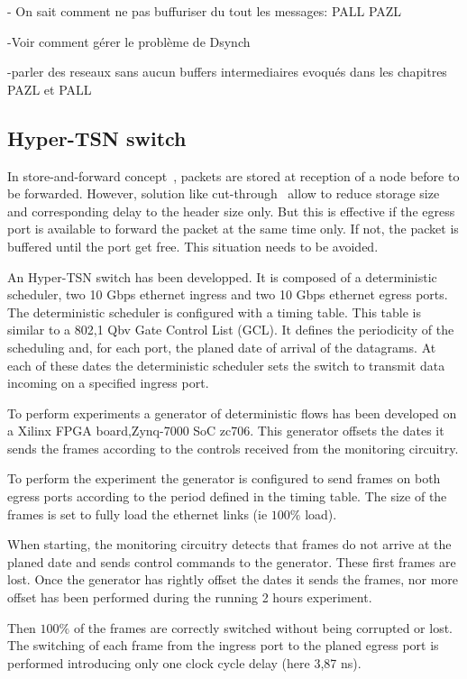 - On sait comment ne pas buffuriser du tout les messages: PALL PAZL

-Voir comment gérer le problème de Dsynch

-parler des reseaux sans aucun buffers intermediaires evoqués dans les chapitres PAZL et PALL
\subsection{Hyper-TSN switch}
In store-and-forward concept~\cite{tindell1992store}, packets are stored at reception of a node before to be forwarded. However, solution like cut-through~\cite{kermani1979virtual} allow to reduce storage size and corresponding delay to the header size only. But this is effective if the egress port is available to forward the packet at the same time only. If not, the packet is buffered until the port get free. This situation needs to be avoided.

An Hyper-TSN switch has been developped. It is composed of a deterministic scheduler, two 10 Gbps ethernet ingress and two 10 Gbps ethernet egress ports. The deterministic scheduler is configured with a timing table. This table is similar to a 802,1 Qbv Gate Control List (GCL). It defines the periodicity of the scheduling and, for each port, the planed date of arrival of the datagrams. At each of these dates the deterministic scheduler sets the switch to transmit data incoming on a specified ingress port.

To perform experiments a generator of deterministic flows has been developed on a Xilinx FPGA board,Zynq-7000 SoC zc706. This generator offsets the dates it sends the frames according to the controls received from the monitoring circuitry.

To perform the experiment the generator is configured to send frames on both egress ports according to the period defined in the timing table. The size of the frames is set to fully load the ethernet links (ie $100\%$ load).

When starting, the monitoring circuitry detects that frames do not arrive at the planed date and sends control commands to the generator. These first frames are lost. Once the generator has rightly offset the dates it sends the frames, nor more offset has been performed during the running 2 hours experiment.

Then $100\%$ of the frames are correctly switched without being corrupted or lost. The switching of each frame from the ingress port to the planed egress port is performed introducing only one clock cycle delay (here 3,87 ns).
